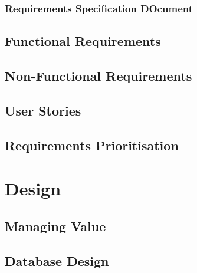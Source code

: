 \documentclass{l3proj}
\begin{document}
\subsection{Requirements Specification DOcument}

\section{Functional Requirements}

\section{Non-Functional Requirements}

\section{User Stories}

\section{Requirements Prioritisation}

\chapter{Design}
\label{design}

\section{Managing Value}

\section{Database Design}

\end{document}
